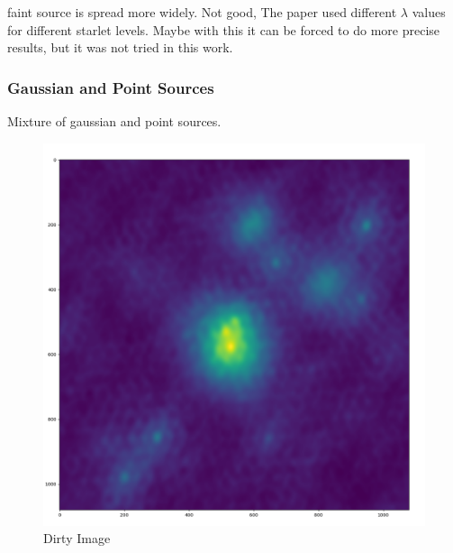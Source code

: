 faint source is spread more widely. Not good, The paper \cite{starck2015starlet} used different $\lambda$ values for different starlet levels. Maybe with this it can be forced to do more precise results, but it was not tried in this work.

\subsubsection{Gaussian and Point Sources}
Mixture of gaussian and point sources. 

\begin{figure}[h]
	\centering
	\includegraphics[width=0.5\linewidth]{./chapters/05.algorithms/results/sim00_mixed_sources_dirty.png}
	\caption{Dirty Image}
	\label{alg:gauss:dirty}
\end{figure}

